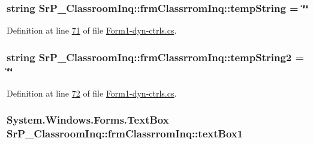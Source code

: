 \hypertarget{class_sr_p___classroom_inq_1_1frm_classrrom_inq_aaad277eaea17731f132fb18aa3560a91}{
\subsubsection[{temp\-String}]{\setlength{\rightskip}{0pt plus 5cm}string {\bf \-Sr\-P\-\_\-\-Classroom\-Inq\-::frm\-Classrrom\-Inq\-::temp\-String} = \char`\"{}\char`\"{}}}
\label{class_sr_p___classroom_inq_1_1frm_classrrom_inq_aaad277eaea17731f132fb18aa3560a91}


\-Definition at line \hyperlink{_form1-dyn-ctrls_8cs_source_l00071}{71} of file \hyperlink{_form1-dyn-ctrls_8cs_source}{\-Form1-\/dyn-\/ctrls.\-cs}.

\hypertarget{class_sr_p___classroom_inq_1_1frm_classrrom_inq_a4ebaa0f6e4e9f61300c6aae855fc8fc1}{
\subsubsection[{temp\-String2}]{\setlength{\rightskip}{0pt plus 5cm}string {\bf \-Sr\-P\-\_\-\-Classroom\-Inq\-::frm\-Classrrom\-Inq\-::temp\-String2} = \char`\"{}\char`\"{}}}
\label{class_sr_p___classroom_inq_1_1frm_classrrom_inq_a4ebaa0f6e4e9f61300c6aae855fc8fc1}


\-Definition at line \hyperlink{_form1-dyn-ctrls_8cs_source_l00072}{72} of file \hyperlink{_form1-dyn-ctrls_8cs_source}{\-Form1-\/dyn-\/ctrls.\-cs}.

\hypertarget{class_sr_p___classroom_inq_1_1frm_classrrom_inq_a3ee11679c61cc3228121b7fe4f51d0c8}{
\subsubsection[{text\-Box1}]{\setlength{\rightskip}{0pt plus 5cm}\-System.\-Windows.\-Forms.\-Text\-Box {\bf \-Sr\-P\-\_\-\-Classroom\-Inq\-::frm\-Classrrom\-Inq\-::text\-Box1}}}
\label{class_sr_p___classroom_inq_1_1frm_classrrom_inq_a3ee11679c61cc3228121b7fe4f51d0c8}


